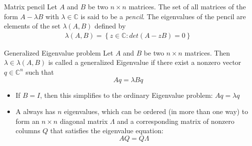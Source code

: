 \documentclass[10pt]{beamer}  %
\begin{document}
\begin{frame}
\frametitle{\secname}\framesubtitle{}\footnotesize
\begin{block}{Matrix pencil}
  Let $A$ and $B$ be two $n\times n$ matrices. The set of all matrices of the form $A-\lambda B$ with $\lambda \in \mathbb{C}$ is said to be a \emph{pencil}. The eigenvalues of the pencil are elements of the set $\lambda(A,B)$ defined by
  \begin{align*}
    \lambda(A,B) =  \left\{z \in \mathbb{C}:det(A-zB)=0\right\}
  \end{align*}
\end{block}
\begin{block}{Generalized Eigenvalue problem}
  Let $A$ and $B$ be two $n\times n$ matrices. Then $\lambda \in \lambda(A,B)$ is called a generalized Eigenvalue if there exist a nonzero vector $q\in \mathbb{C}^n$ such that $$A q = \lambda B q$$
\end{block}
\begin{itemize}
\item If $B=I$, then this simplifies to the ordinary Eigenvalue problem: $A q = \lambda q$
\item A always has $n$ eigenvalues, which can be ordered (in more than one way) to form an $n\times n$ diagonal matrix $\Lambda$ and a corresponding matrix of nonzero columns $Q$ that satisfies the eigenvalue equation: $$AQ = Q\Lambda$$
\end{itemize}
\end{frame}
\end{document}
